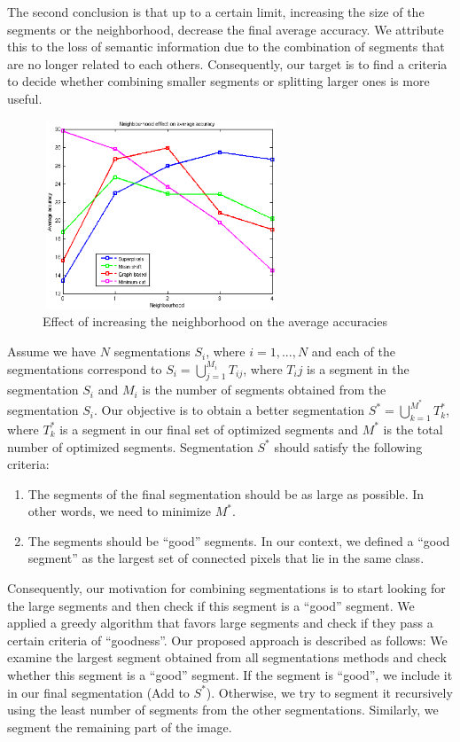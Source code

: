 \documentclass[10pt,twocolumn,letterpaper]{article}
\begin{document}
The second conclusion is that up to a certain limit, increasing the size of the segments or the neighborhood, decrease the final average accuracy.
We attribute this to the loss of semantic information due to the combination of segments that are no longer related to each others.
Consequently, our target is to find a criteria to decide whether combining smaller segments or splitting larger ones is more useful.

\begin{figure}
\includegraphics[width=200pt,height=160pt]{./Figures/neigh_acc.eps}
\centering
\caption{Effect of increasing the neighborhood on the average accuracies}
\label{fig:neigh_effect}
\end{figure}

Assume we have $N$ segmentations $S_i$, where $i = 1, ..., N$ and each of the
segmentations correspond to $S_i = \bigcup_{j=1}^{M_i}T_{ij}$, where $T_ij$ is a
segment in the segmentation $S_i$ and $M_i$ is the number of segments obtained
from the segmentation $S_i$. Our objective is to obtain a better segmentation
$S^* = \bigcup_{k=1}^{M^*}T_k^*$, where $T^*_k$ is a segment in our final set of
optimized segments and $M^*$ is the total number of optimized segments. Segmentation
$S^*$ should satisfy the following criteria:

\begin{enumerate}
\item
The segments of the final segmentation should be as large as possible. In other
words, we need to minimize $M^*$.
\item
The segments should be ``good'' segments. In our context, we defined a ``good
segment'' as the largest set of connected pixels that lie in the same class.
\end{enumerate}

Consequently, our motivation for combining segmentations is to start looking for
the large segments and then check if this segment is a ``good'' segment. We
applied a greedy algorithm that favors large segments and check if they pass a
certain criteria of ``goodness''.
Our proposed approach is described as follows:
We examine the largest segment obtained from all segmentations methods and check whether this segment is a ``good'' segment.
If the segment is ``good'', we include it in our final segmentation (Add to $S^*$).
Otherwise, we try to segment it recursively using the least number of segments from the other segmentations.
Similarly, we segment the remaining part of the image.
\end{document}
